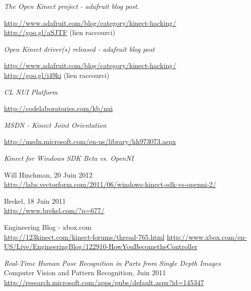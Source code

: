 \begin{thebibliography}{200}
\begin{footnotesize}
  \emph{The Open Kinect project - adafruit blog post}. \\
  \begin{tiny}
  \url{http://www.adafruit.com/blog/category/kinect-hacking/}\\
  \url{http://goo.gl/aSJTF} (lien raccourci)
  \end{tiny}

  \emph{Open Kinect driver(s) released - adafruit blog post}\\
  \begin{tiny}
  \url{http://www.adafruit.com/blog/category/kinect-hacking/}\\
  \url{http://goo.gl/i49ki} (lien raccourci)
  \end{tiny}

  \emph{CL NUI Platform}\\
  \begin{tiny}
  \url{http://codelaboratories.com/kb/nui}
  \end{tiny}
  
  \emph{MSDN - Kinect Joint Orientation}\\
  \begin{tiny}
  \url{http://msdn.microsoft.com/en-us/library/hh973073.aspx}
  \end{tiny}
  
  \emph{Kinect for Windows SDK Beta vs. OpenNI}\\
  \begin{tiny}
  Will Hinchman, 20 Juin 2012\\
  \url{http://labs.vectorform.com/2011/06/windows-kinect-sdk-vs-openni-2/}
  \end{tiny}
  
  \begin{tiny}
  Brekel, 18 Juin 2011\\
  \url{http://www.brekel.com/?p=677/}
  \end{tiny}
  
  \begin{tiny}
  Engineering Blog - xbox.com\\
  \url{http://123kinect.com/kinect-forums/thread-765.html}
  \url{http://www.xbox.com/en-US/Live/EngineeringBlog/122910-HowYouBecometheController}
  \end{tiny}

  \begin{tiny}
  \emph{Real-Time Human Pose Recognition in Parts from Single Depth Images}\\
  Computer Vision and Pattern Recognition, Juin 2011\\
  \url{http://research.microsoft.com/apps/pubs/default.aspx?id=145347}
  \end{tiny}
  

\end{footnotesize}
\end{thebibliography}
